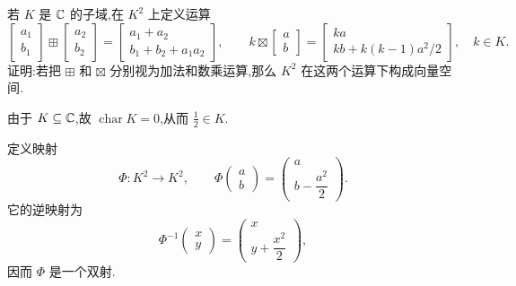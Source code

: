 \begin{problem}
    若 $K$ 是 $\mathbb{C}$ 的子域,在 $K^2$ 上定义运算
    \[
        \begin{bmatrix}
            a_1\\
            b_1
        \end{bmatrix}
        \boxplus
        \begin{bmatrix}
            a_2\\
            b_2
        \end{bmatrix}
        =
        \begin{bmatrix}
            a_1+a_2\\
            b_1+b_2+a_1a_2
        \end{bmatrix},
        \qquad
        k\boxtimes
        \begin{bmatrix}
            a\\
            b
        \end{bmatrix}
        =
        \begin{bmatrix}
            ka\\
            kb+k(k-1)a^2/2
        \end{bmatrix},
        \quad k\in K.
    \]
    证明:若把 $\boxplus$ 和 $\boxtimes$ 分别视为加法和数乘运算,那么 $K^2$ 在这两个运算下构成向量空间.

    \begin{solution}
        由于 $K\subseteq \mathbb{C}$,故 $\operatorname{char}K=0$,从而 $\frac12\in K$.

        定义映射
        \[
            \Phi:K^2\to K^2,\qquad
            \Phi\begin{pmatrix} a\\ b \end{pmatrix}
            =
            \begin{pmatrix}
                a\\
                b-\dfrac{a^2}{2}
            \end{pmatrix}.
        \]
        它的逆映射为
        \[
            \Phi^{-1}\begin{pmatrix} x\\ y \end{pmatrix}
            =
            \begin{pmatrix}
                x\\
                y+\dfrac{x^2}{2}
            \end{pmatrix},
        \]
        因而 $\Phi$ 是一个双射.


\end{solution}
\end{problem}
